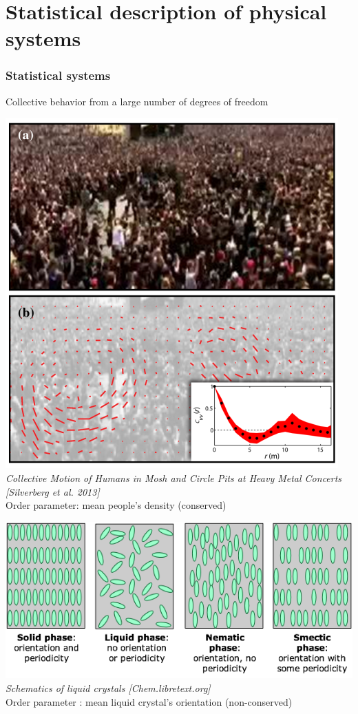 \documentclass[9pt, dvipsnames]{beamer} %
\begin{document}
\section{Statistical description of physical systems}

\begin{frame}
    \frametitle{Statistical systems}
    Collective behavior from a large number of degrees of freedom \\
    \begin{overprint}
	    \centering
	    \includegraphics[scale=0.3]{mosh-pit.png} \\
	    {\it Collective Motion of Humans in Mosh and Circle Pits at Heavy Metal Concerts [Silverberg et al. 2013]} \\[0.5cm]
	    Order parameter: mean people's density (conserved)
	    
	    \centering
	   \includegraphics[width=\linewidth]{nematic-smectic.jpg} \\
	   {\it Schematics of liquid crystals [Chem.libretext.org] }\\[1cm]
	   Order parameter : mean liquid crystal's orientation (non-conserved)
   \end{overprint}
\end{frame}
\end{document}
